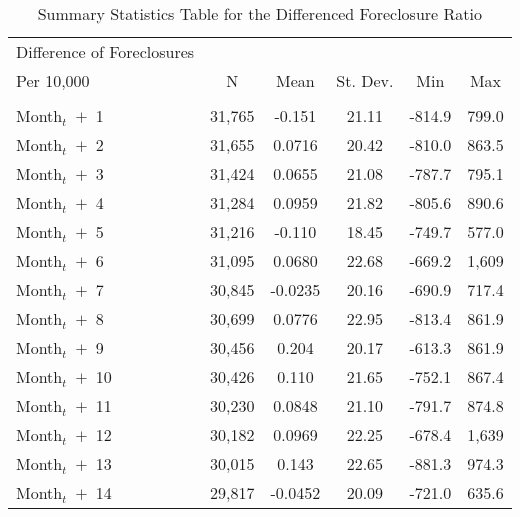 
\begin{table}[H]
\caption{Summary Statistics Table for the Differenced Foreclosure Ratio} \label{tab:lnHV}
\begin{center}
\begin{tabular}{lccccc} \hline

Difference of Foreclosures  &  &  &  &  & \\
Per 10,000  & N & Mean & St. Dev. & Min & Max  \\\hline
\vspace{4pt} & \begin{footnotesize}\end{footnotesize} & \begin{footnotesize}\end{footnotesize} & \begin{footnotesize}\end{footnotesize} & \begin{footnotesize}\end{footnotesize} & \begin{footnotesize}\end{footnotesize} \\
Month$_t$\ $+$\ 1 & 31,765 & -0.151 & 21.11 & -814.9 & 799.0 \\
Month$_t$\ $+$\ 2 & 31,655 & 0.0716 & 20.42 & -810.0 & 863.5 \\
Month$_t$\ $+$\ 3 & 31,424 & 0.0655 & 21.08 & -787.7 & 795.1 \\
Month$_t$\ $+$\ 4 & 31,284 & 0.0959 & 21.82 & -805.6 & 890.6 \\
Month$_t$\ $+$\ 5 & 31,216 & -0.110 & 18.45 & -749.7 & 577.0 \\
Month$_t$\ $+$\ 6 & 31,095 & 0.0680 & 22.68 & -669.2 & 1,609 \\
Month$_t$\ $+$\ 7 & 30,845 & -0.0235 & 20.16 & -690.9 & 717.4 \\
Month$_t$\ $+$\ 8 & 30,699 & 0.0776 & 22.95 & -813.4 & 861.9 \\
Month$_t$\ $+$\ 9 & 30,456 & 0.204 & 20.17 & -613.3 & 861.9 \\
Month$_t$\ $+$\ 10 & 30,426 & 0.110 & 21.65 & -752.1 & 867.4 \\
Month$_t$\ $+$\ 11 & 30,230 & 0.0848 & 21.10 & -791.7 & 874.8 \\
Month$_t$\ $+$\ 12 & 30,182 & 0.0969 & 22.25 & -678.4 & 1,639 \\
Month$_t$\ $+$\ 13 & 30,015 & 0.143 & 22.65 & -881.3 & 974.3 \\
Month$_t$\ $+$\ 14& 29,817 & -0.0452 & 20.09 & -721.0 & 635.6 \\

\end{tabular}
\end{center}
\end{table}
